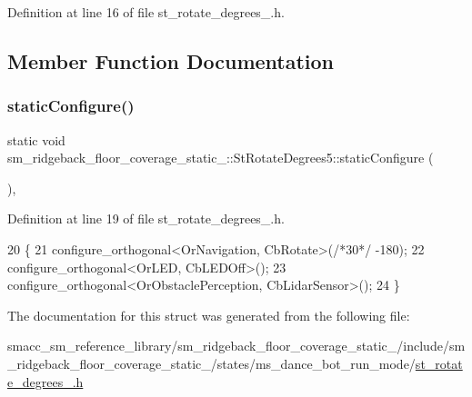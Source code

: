 Definition at line 16 of file st\+\_\+rotate\+\_\+degrees\+\_.\+h.



\subsection{Member Function Documentation}
\mbox{\label{structsm__ridgeback__floor__coverage__static__1_1_1StRotateDegrees5_ae37fffe9d89ddc649f626cb6bdf034ee}} 
\subsubsection{\texorpdfstring{static\+Configure()}{staticConfigure()}}
{\footnotesize\ttfamily static void sm\+\_\+ridgeback\+\_\+floor\+\_\+coverage\+\_\+static\+\_\+::\+St\+Rotate\+Degrees5\+::static\+Configure (\begin{DoxyParamCaption}{ }\end{DoxyParamCaption})\hspace{0.3cm}{\ttfamily [inline]}, {\ttfamily [static]}}



Definition at line 19 of file st\+\_\+rotate\+\_\+degrees\+\_.\+h.


\begin{DoxyCode}
20     \{
21       configure\_orthogonal<OrNavigation, CbRotate>(\textcolor{comment}{/*30*/} -180);
22       configure\_orthogonal<OrLED, CbLEDOff>();
23       configure\_orthogonal<OrObstaclePerception, CbLidarSensor>();
24     \}
\end{DoxyCode}


The documentation for this struct was generated from the following file\+:\begin{DoxyCompactItemize}
\item 
smacc\+\_\+sm\+\_\+reference\+\_\+library/sm\+\_\+ridgeback\+\_\+floor\+\_\+coverage\+\_\+static\+\_/include/sm\+\_\+ridgeback\+\_\+floor\+\_\+coverage\+\_\+static\+\_/states/ms\+\_\+dance\+\_\+bot\+\_\+run\+\_\+mode/\hyperlink{sm__ridgeback__floor__coverage__static__1_2include_2sm__ridgeback__floor__coverage__static__1_2s9a8cffb2bf8b64abaf25ecff1d61b725}{st\+\_\+rotate\+\_\+degrees\+\_.\+h}\end{DoxyCompactItemize}
